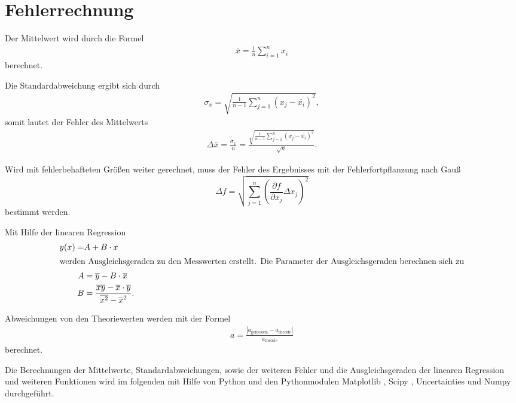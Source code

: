 \section{Fehlerrechnung}
\label{sec:Fehlerrechnung}

Der Mittelwert wird durch die Formel
\begin{align*}
    \bar{x}=\frac{1}{n} \sum_{i=1}^n x_i \label{eqn:Mittelwert}
\end{align*}
berechnet.

Die Standardabweichung ergibt sich durch
\begin{align*}
    \sigma_x=\sqrt{\frac{1}{n-1}\sum_{j=1}^n (x_j-\bar{x_i})^2},
\end{align*}
somit lautet der Fehler des Mittelwerts
\begin{align*}
    \Delta \bar{x}= \frac{\sigma_x}{n} = \frac{\sqrt{\frac{1}{n-1}\sum_{j=1}^n (x_j-\bar{x_i})^2}}{\sqrt{n}}.
\end{align*}

Wird mit fehlerbehafteten Größen weiter gerechnet, muss der Fehler des Ergebnisses mit der Fehlerfortpflanzung nach Gauß
\begin{equation*}
    \Delta f=\sqrt{\sum_{j=1}^n \left(\frac{\partial f}{\partial x_j}\Delta x_j \right)^{2} }\label{eqn:Gauß}
\end{equation*}
bestimmt werden.

Mit Hilfe der linearen Regression 
\begin{subequations}
    \label{eqn:lin}
\begin{align}
    y(x)=&A+B\cdot x\\
    \intertext{werden Ausgleichsgeraden zu den Messwerten erstellt. Die Parameter der Ausgleichsgeraden berechnen sich zu}
    A&=\overline{y}-B\cdot \overline{x}\label{eqn:lina}\\
    B&=\frac{\overline{xy}-\overline{x}\cdot \overline{y}}{\overline{x^2}-\overline{x}^2}\label{eqn:linb}.
\end{align}
\end{subequations}

Abweichungen von den Theoriewerten werden mit der Formel
\begin{align}
  a=\frac{|a_\mathrm{gemessen}-a_\mathrm{theorie}|}{a_\mathrm{theorie}} \label{eqn:abweich}
\end{align}
berechnet.

Die Berechnungen der Mittelwerte, Standardabweichungen, sowie der weiteren Fehler und die Ausgleichsgeraden der linearen Regression und weiteren Funktionen
wird im folgenden mit Hilfe von Python und den Pythonmodulen Matplotlib \cite{matplotlib}, Scipy \cite{scipy}, Uncertainties \cite{uncertainties} und Numpy \cite{numpy}
durchgeführt.